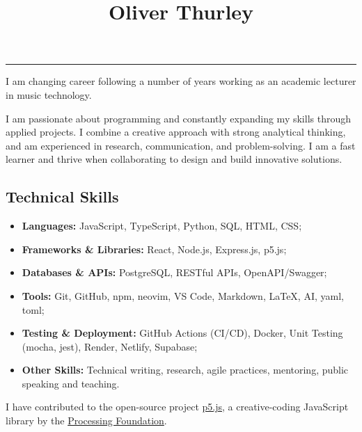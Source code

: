 \documentclass[10pt,a4paper]{article}
\title{{\huge Oliver Thurley}{\raggedright}}
\author{}
\date{}
\makeatletter
\renewcommand{\maketitle}{\bgroup\setlength{\parindent}{0pt}
\begin{flushleft}
  \normalfont{\@title}
  \@author
\end{flushleft}\egroup
}
\providecommand{\tightlist}{%
  \setlength{\itemsep}{0pt}\setlength{\parskip}{0pt}}
\makeatother
\begin{document}
\maketitle

\vspace{0.5em}
\noindent\href{mailto:o.thrly@gmail.com}{} \hfill
{} \hfill
\href{https://thrly.com}{} \hfill
\href{https://github.com/thrly}{} \hfill
\href{https://linkedin.com/in/oliver-thurley}{}

\vspace{0.75em}
\noindent\rule{\textwidth}{0.5pt}

I am changing career following a number of years working as an academic
lecturer in music technology.

I am passionate about programming and constantly expanding my skills
through applied projects. I combine a creative approach with strong
analytical thinking, and am experienced in research, communication, and
problem-solving. I am a fast learner and thrive when collaborating to
design and build innovative solutions.

\subsection{Technical Skills}\label{technical-skills}

\begin{itemize}
\tightlist
\item
  \textbf{Languages:} JavaScript, TypeScript, Python, SQL, HTML, CSS;
\item
  \textbf{Frameworks \& Libraries:} React, Node.js, Express.js, p5.js;
\item
  \textbf{Databases \& APIs:} PostgreSQL, RESTful APIs, OpenAPI/Swagger;
\item
  \textbf{Tools:} Git, GitHub, npm, neovim, VS Code, Markdown, LaTeX,
  AI, yaml, toml;
\item
  \textbf{Testing \& Deployment:} GitHub Actions (CI/CD), Docker, Unit
  Testing (mocha, jest), Render, Netlify, Supabase;
\item
  \textbf{Other Skills:} Technical writing, research, agile practices,
  mentoring, public speaking and teaching.
\end{itemize}

I have contributed to the open-source project
\href{https://p5js.org/}{p5.js}, a creative-coding JavaScript library by
the \href{https://processingfoundation.org/}{Processing Foundation}.
\end{document}
